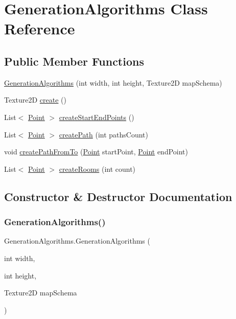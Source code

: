 \hypertarget{class_generation_algorithms}{}\section{Generation\+Algorithms Class Reference}
\label{class_generation_algorithms}
\subsection*{Public Member Functions}
\begin{DoxyCompactItemize}
\item 
\mbox{\hyperlink{class_generation_algorithms_a58976e43c2d0793d31eb501800dbc72f}{Generation\+Algorithms}} (int width, int height, Texture2D map\+Schema)
\item 
Texture2D \mbox{\hyperlink{class_generation_algorithms_a0400937de66ac97377508cda8074470b}{create}} ()
\item 
List$<$ \mbox{\hyperlink{class_point}{Point}} $>$ \mbox{\hyperlink{class_generation_algorithms_aa205e52cda5943e2f354ff8361445a08}{create\+Start\+End\+Points}} ()
\item 
List$<$ \mbox{\hyperlink{class_point}{Point}} $>$ \mbox{\hyperlink{class_generation_algorithms_a40edc3df89ea89a97189093348b712df}{create\+Path}} (int paths\+Count)
\item 
void \mbox{\hyperlink{class_generation_algorithms_a72d9a98fc09ff078dc75a91710be4aba}{create\+Path\+From\+To}} (\mbox{\hyperlink{class_point}{Point}} start\+Point, \mbox{\hyperlink{class_point}{Point}} end\+Point)
\item 
List$<$ \mbox{\hyperlink{class_point}{Point}} $>$ \mbox{\hyperlink{class_generation_algorithms_a8f99868be40947066eac8896b3e6a445}{create\+Rooms}} (int count)
\end{DoxyCompactItemize}


\subsection{Constructor \& Destructor Documentation}
\mbox{\label{class_generation_algorithms_a58976e43c2d0793d31eb501800dbc72f}} 
\subsubsection{\texorpdfstring{Generation\+Algorithms()}{GenerationAlgorithms()}}
{\footnotesize\ttfamily Generation\+Algorithms.\+Generation\+Algorithms (\begin{DoxyParamCaption}\item[{int}]{width,  }\item[{int}]{height,  }\item[{Texture2D}]{map\+Schema }\end{DoxyParamCaption})}



